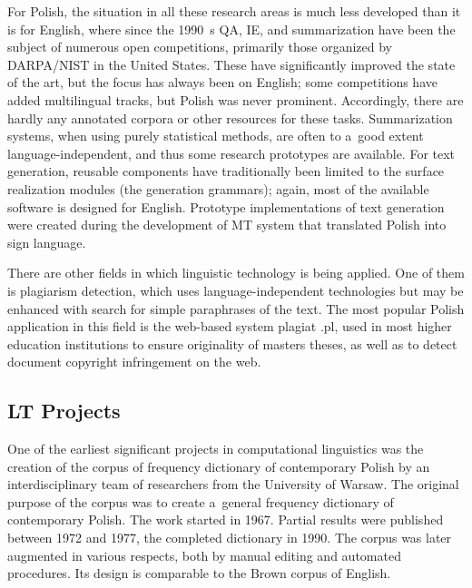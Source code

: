 \begin{multicols}{2}
For Polish, the situation in all these research areas is much less
developed than it is for English, where since the 1990~s QA, IE, and
summarization have been the subject of numerous open competitions,
primarily those organized by DARPA/NIST in the United States. These
have significantly improved the state of the art, but the focus has
always been on English; some competitions have added multilingual
tracks, but Polish was never prominent. Accordingly, there are hardly
any annotated corpora or other resources for these tasks.
Summarization systems, when using purely statistical methods, are
often to a~good extent language-independent, and thus some research
prototypes are available. For text generation, reusable components
have traditionally been limited to the surface realization modules
(the {\textquotedbl}generation grammars{\textquotedbl}); again, most
of the available software is designed for English. Prototype
implementations of text generation were created during the development
of MT system that translated Polish into sign language. 

There are other fields in which linguistic technology is being
applied. One of them is plagiarism detection, which uses
language-independent technologies but may be enhanced with search for
simple paraphrases of the text. The most popular Polish application in
this field is the web-based system plagiat .pl, used in most higher
education institutions to ensure originality of
master{\textquotesingle}s theses, as well as to detect document
copyright infringement on the web. 

\subsection[LT Projects]{LT Projects} 

One of the earliest significant projects in computational linguistics
was the creation of the corpus of frequency dictionary of contemporary
Polish by an interdisciplinary team of researchers from the University
of Warsaw. The original purpose of the corpus was to create a~general
frequency dictionary of contemporary Polish. The work started in 1967.
Partial results were published between 1972 and 1977, the completed
dictionary in 1990. The corpus was later augmented in various
respects, both by manual editing and automated procedures. Its design
is comparable to the Brown corpus of English. 


\end{multicols}
